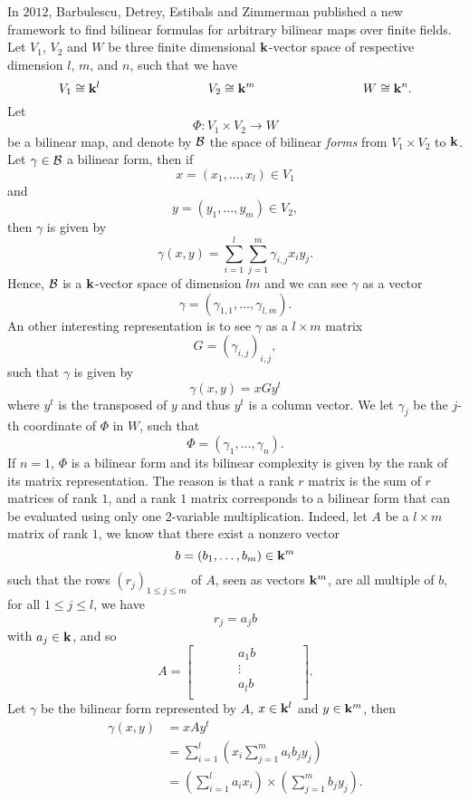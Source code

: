 In $2012$, Barbulescu, Detrey, Estibals and Zimmerman published a new framework
to find bilinear formulas for arbitrary bilinear maps over finite fields. Let
$V_1$, $V_2$ and $W$ be three finite dimensional $\mathbf{k}$-vector space of respective
dimension $l$, $m$, and $n$, such that we have
\[
  V_1\cong\K^l\hspace{3cm}V_2\cong\K^m\hspace{3cm}W\cong\K^n.
\]
Let
\[
  \Phi:V_1\times V_2\to W
\]
be a bilinear map, and denote by $\mathcal{B}$ the space of bilinear \emph{forms} from
$V_1\times V_2$ to $\mathbf{k}$. Let $\gamma\in\mathcal{B}$ a bilinear form, then if
\[
  x = (x_1, \dots, x_l)\in V_1
\]
and
\[
  y = (y_1, \dots, y_m)\in V_2,
\]
then $\gamma$ is given by
\[
  \gamma(x, y) = \sum_{i=1}^{l}\sum_{j=1}^m \gamma_{i, j} x_i y_j.
\]
Hence, $\mathcal{B}$ is a $\mathbf{k}$-vector space of dimension $lm$ and we can see $\gamma$ as
a vector
\[
  \gamma = (\gamma_{1, 1}, \dots, \gamma_{l, m}).
\]
An other interesting representation is to see $\gamma$ as a $l\times m$ matrix
\[
  G = (\gamma_{i, j})_{i, j},
\]
such that $\gamma$ is given by
\[
  \gamma(x, y) = x G y^t
\]
where $y^t$ is the transposed of $y$ and thus $y^t$ is a column vector. We let
$\gamma_j$ be the $j$-th coordinate of $\Phi$ in $W$, such that
\[
  \Phi = (\gamma_1, \dots, \gamma_n).
\]
If $n=1$, $\Phi$ is a bilinear form and its bilinear complexity is given by the
rank of its matrix representation. The reason is that a rank $r$ matrix is the sum of $r$ matrices of rank $1$,
and a rank $1$ matrix corresponds to a bilinear form that can be evaluated using
only one $2$-variable multiplication. Indeed, let $A$ be a $l\times m$ matrix of rank $1$, we know that
there exist a nonzero vector 
\[
  b=(b_1, \dots, b_m)\in\mathbf{k}^m
\]
such that the rows $(r_j)_{1\leq j \leq m}$ of $A$, seen as vectors $\mathbf{k}^m$, are
all multiple of $b$, \ie for all $1\leq j \leq l$, we have
\[
  r_j = a_j b
\]
with $a_j\in\mathbf{k}$, and so
\[
  A =
\begin{bmatrix}
  & & & & a_1 b & & & & \\
  & & & & \vdots & & & & \\
  & & & & a_l b & & & & \\
\end{bmatrix}.
\]
Let $\gamma$ be the bilinear form represented by $A$, $x\in\mathbf{k}^l$ and $y\in\mathbf{k}^m$, then
\begin{align*}
  \gamma(x, y) &= x A y^t \\
  &= \sum_{i=1}^{l}(x_i \sum_{j=1}^m a_i b_j y_j) \\
  &= (\sum_{i=1}^l a_i x_i)\times(\sum_{j=1}^m b_j y_j).
\end{align*}
